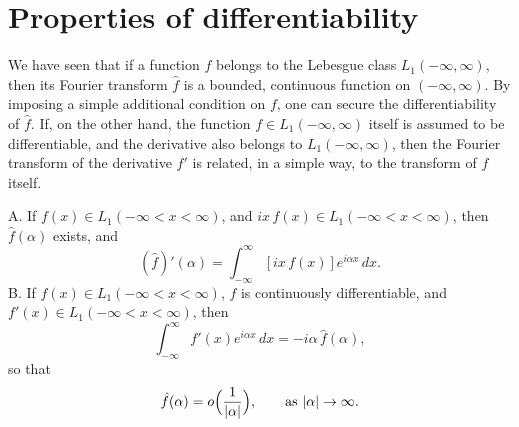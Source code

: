 \section{Properties of differentiability}
\label{sec:I-3}

We have seen that if a function $f$ belongs to the Lebesgue class $L_1(-\infty,\infty)$, then its Fourier transform $\hat f$ is a bounded, continuous function on $(-\infty,\infty)$. By imposing a simple additional condition on $f$, one can secure the differentiability of $\hat f$. If, on the other hand, the function $f\in L_1(-\infty,\infty)$ itself is assumed to be differentiable, and the derivative also belongs to $L_1(-\infty,\infty)$, then the Fourier transform of the derivative $f'$ is related, in a simple way, to the transform of $f$ itself.

\begin{theorem}\label{thm:I-3}
\textup{A.} If $f(x)\in L_1(-\infty<x<\infty)$, and $ix\,f(x)\in L_1(-\infty<x<\infty)$, then $\hat f(\alpha)$ exists, and
\begin{equation}\label{eq:I-3.A}
(\hat f)'(\alpha)=\int_{-\infty}^{\infty}[ix\,f(x)]e^{i\alpha x}\,dx.
\end{equation}
\textup{B.} If $f(x)\in L_1(-\infty<x<\infty)$, $f$ is continuously differentiable, and $f'(x)\in L_1(-\infty<x<\infty)$, then
\begin{equation}\label{eq:I-3.B}
\int_{-\infty}^{\infty}f'(x)e^{i\alpha x}\,dx=-i\alpha\,\hat f(\alpha),
\end{equation}
so that
\begin{equation}\label{eq:I-3.B2}
\hat f(\alpha)=o\Bigl(\frac{1}{|\alpha|}\Bigr),
\qquad\text{as }|\alpha|\to\infty.
\end{equation}
\end{theorem}

